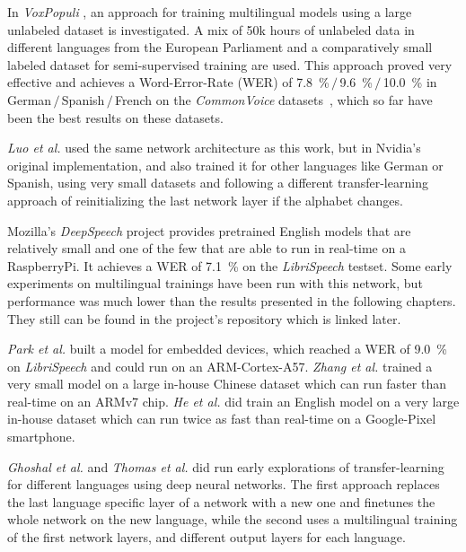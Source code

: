 In \textit{VoxPopuli} \cite{VOXPOP}, an approach for training multilingual models using a large unlabeled dataset is investigated. A mix of 50k hours of unlabeled data in different languages from the European Parliament and a comparatively small labeled dataset for semi-supervised training are used. This approach proved very effective and achieves a Word-Error-Rate (WER) of \SI{7.8}{\percent}\,$/$\,\SI{9.6}{\percent}\,$/$\,\SI{10.0}{\percent} in German\,$/$\,Spanish\,$/$\,French on the \textit{CommonVoice} datasets~\cite{COMV}, which so far have been the best results on these datasets.

\textit{Luo et al.} \cite{QNTECR} used the same network architecture as this work, but in Nvidia's original implementation, and also trained it for other languages like German or Spanish, using very small datasets and following a different transfer-learning approach of reinitializing the last network layer if the alphabet changes. 

Mozilla's \textit{DeepSpeech} project \cite{DEPSPE} provides pretrained English models that are relatively small and one of the few that are able to run in real-time on a RaspberryPi. It achieves a WER of \SI{7.1}{\percent} on the \textit{LibriSpeech} \cite{LIBSPE} testset. Some early experiments on multilingual trainings have been run with this network, but performance was much lower than the results presented in the following chapters. They still can be found in the project's repository which is linked later.

\textit{Park et al.} \cite{FNNMED} built a model for embedded devices, which reached a WER of \SI{9.0}{\percent} on \textit{LibriSpeech} and could run on an ARM-Cortex-A57. \textit{Zhang et al.} \cite{TINTRA} trained a very small model on a large in-house Chinese dataset which can run faster than real-time on an ARMv7 chip. \textit{He et al.} \cite{STRSRM} did train an English model on a very large in-house dataset which can run twice as fast than real-time on a Google-Pixel smartphone.

\textit{Ghoshal et al.} \cite{MLDNN} and \textit{Thomas et al.} \cite{MLFDNN} did run early explorations of transfer-learning for different languages using deep neural networks. The first approach replaces the last language specific layer of a network with a new one and finetunes the whole network on the new language, while the second uses a multilingual training of the first network layers, and different output layers for each language.

